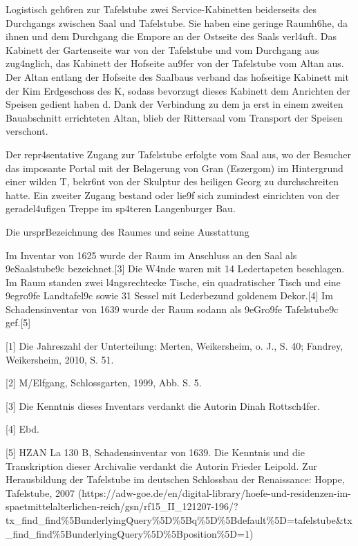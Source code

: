 \documentclass[
  letterpaper,
]{book}
\begin{document}
Logistisch geh\xb6ren zur Tafelstube zwei Service-Kabinetten
beiderseits des Durchgangs zwischen Saal und Tafelstube. Sie haben eine
geringe Raumh\xb6he, da \xbcber ihnen und dem Durchgang die
Empore an der Ostseite des Saals verl\xa4uft. Das Kabinett der
Gartenseite war von der Tafelstube und vom Durchgang aus
zug\xa4nglich, das Kabinett der Hofseite au\x9fer von der
Tafelstube vom Altan aus. Der Altan entlang der Hofseite des Saalbaus
verband das hofseitige Kabinett mit der K\xbcche im Erdgeschoss des
K\xbcchenbaus, sodass bevorzugt dieses Kabinett dem Anrichten der
Speisen gedient haben d\xbcrfte. Dank der Verbindung zu dem ja erst
in einem zweiten Bauabschnitt errichteten Altan, blieb der Rittersaal
vom Transport der Speisen verschont.

Der repr\xa4sentative Zugang zur Tafelstube erfolgte vom Saal aus,
wo der Besucher das imposante Portal mit der Belagerung von Gran
(Eszergom) im Hintergrund einer wilden T\xbcrkenschlacht,
bekr\xb6nt von der Skulptur des heiligen Georg zu durchschreiten
hatte. Ein zweiter Zugang bestand oder lie\x9f sich zumindest
einrichten von der geradel\xa4ufigen Treppe im sp\xa4teren
Langenburger Bau.

Die urspr\xbcngliche Bezeichnung des Raumes und seine Ausstattung

Im Inventar von 1625 wurde der Raum im Anschluss an den
Saal als \x9eSaalstube\x9c bezeichnet.{[}3{]} Die
W\xa4nde waren mit 14 Ledertapeten beschlagen. Im Raum standen zwei
l\xa4ngsrechtecke Tische, ein quadratischer Tisch und eine
\x9egro\x9fe Landtafel\x9c sowie 31 Sessel mit
Lederbez\xbcgen und goldenem Dekor.{[}4{]} Im Schadensinventar von
1639 wurde der Raum sodann als \x9eGro\x9fe
Tafelstube\x9c gef\xbchrt.{[}5{]}

{[}1{]} Die Jahreszahl der Unterteilung: Merten, Weikersheim, o. J., S.
40; Fandrey, Weikersheim, 2010, S. 51.

{[}2{]} M\xbcnzenmayer/Elfgang, Schlossgarten, 1999, Abb. S. 5.

{[}3{]} Die Kenntnis dieses Inventars verdankt die Autorin Dinah
Rottsch\xa4fer.

{[}4{]} Ebd.

{[}5{]} HZAN La 130 B, Schadensinventar von 1639. Die
Kenntnis und die Transkription dieser Archivalie verdankt die Autorin
Frieder Leipold. Zur Herausbildung der Tafelstube im deutschen
Schlossbau der Renaissance: Hoppe, Tafelstube, 2007
(https://adw-goe.de/en/digital-library/hoefe-und-residenzen-im-spaetmittelalterlichen-reich/gsn/rf15\_II\_121207-196/?tx\_find\_find\%5BunderlyingQuery\%5D\%5Bq\%5D\%5Bdefault\%5D=tafelstube\&tx\_find\_find\%5BunderlyingQuery\%5D\%5Bposition\%5D=1)
\end{document}
